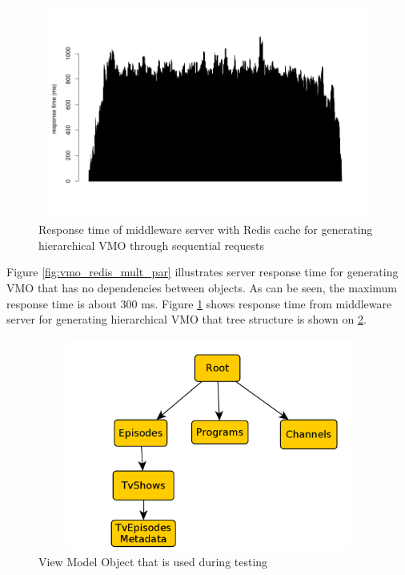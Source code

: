 \begin{figure}[h!]
    \centering
    \includegraphics[width=15cm,height=7cm,keepaspectratio]{images/vmo_redis_mult_seq.png}
    \caption{Response time of middleware server with Redis cache for generating hierarchical VMO through sequential requests}
    \label{fig:vmo_redis_mult_seq}
\end{figure}

Figure \ref{fig:vmo_redis_mult_par} illustrates server response time for generating VMO that has no dependencies between objects. As can be seen, the maximum response time is about 300 ms. Figure \ref{fig:vmo_redis_mult_seq} shows response time from middleware server for generating hierarchical VMO that tree structure is shown on \ref{fig:vmo_test_example}. 

\begin{figure}[h!]
    \centering
    \includegraphics[width=15cm,height=7cm,keepaspectratio]{images/vmo_test_example.png}
    \caption{View Model Object that is used during testing}
    \label{fig:vmo_test_example}
\end{figure}


